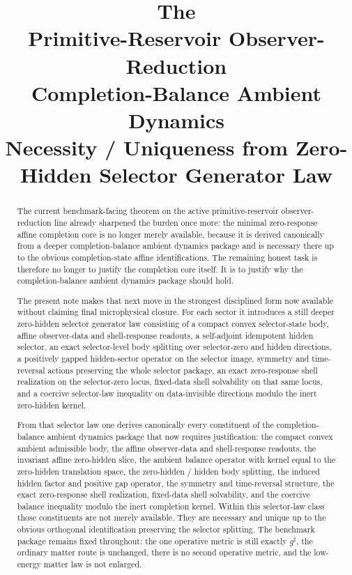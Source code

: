 \documentclass[11pt]{article}
\title{\textbf{The \TheoryName{}}\\[0.4em]
\large Primitive-Reservoir Observer-Reduction\\
\large Completion-Balance Ambient Dynamics\\
\large Necessity / Uniqueness from Zero-Hidden Selector Generator Law}
\author{}
\date{}
\newcommand{\CompletedMetric}{g^{\sharp}}
\begin{document}
\maketitle

\begin{abstract}
The current benchmark-facing theorem on the active primitive-reservoir observer-reduction line already sharpened the burden once more: the minimal zero-response affine completion core is no longer merely available, because it is derived canonically from a deeper completion-balance ambient dynamics package and is necessary there up to the obvious completion-state affine identifications. The remaining honest task is therefore no longer to justify the completion core itself. It is to justify why the completion-balance ambient dynamics package should hold.

The present note makes that next move in the strongest disciplined form now available without claiming final microphysical closure. For each sector it introduces a still deeper zero-hidden selector generator law consisting of a compact convex selector-state body, affine observer-data and shell-response readouts, a self-adjoint idempotent hidden selector, an exact selector-level body splitting over selector-zero and hidden directions, a positively gapped hidden-sector operator on the selector image, symmetry and time-reversal actions preserving the whole selector package, an exact zero-response shell realization on the selector-zero locus, fixed-data shell solvability on that same locus, and a coercive selector-law inequality on data-invisible directions modulo the inert zero-hidden kernel.

From that selector law one derives canonically every constituent of the completion-balance ambient dynamics package that now requires justification: the compact convex ambient admissible body, the affine observer-data and shell-response readouts, the invariant affine zero-hidden slice, the ambient balance operator with kernel equal to the zero-hidden translation space, the zero-hidden / hidden body splitting, the induced hidden factor and positive gap operator, the symmetry and time-reversal structure, the exact zero-response shell realization, fixed-data shell solvability, and the coercive balance inequality modulo the inert completion kernel. Within this selector-law class those constituents are not merely available. They are necessary and unique up to the obvious orthogonal identification preserving the selector splitting. The benchmark package remains fixed throughout: the one operative metric is still exactly \(\CompletedMetric\), the ordinary matter route is unchanged, there is no second operative metric, and the low-energy matter law is not enlarged.
\end{abstract}
\end{document}
